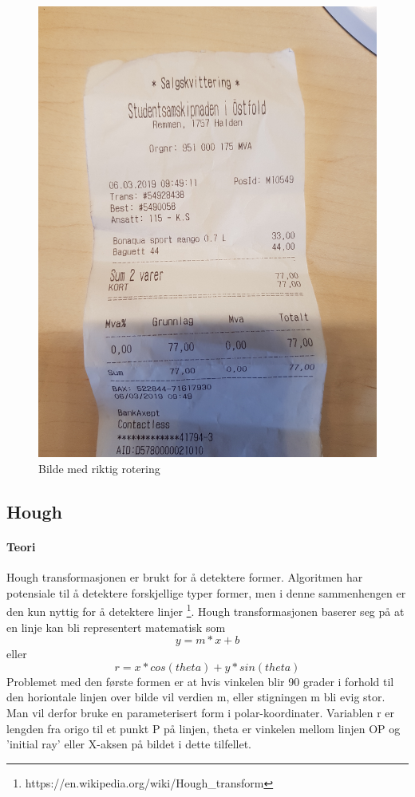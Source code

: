 \documentclass{article}
\begin{document}
\begin{figure}[h]
\centering
\includegraphics[scale=0.05, angle=270]{images/skewed10}
\caption{Bilde med riktig rotering}
\label{fig:skewed10}
\end{figure}

\subsection{Hough}
\paragraph{Teori}
Hough transformasjonen er brukt for å detektere former. Algoritmen har potensiale til å detektere forskjellige typer former, men i denne sammenhengen er den kun nyttig for å detektere linjer \footnote{https://en.wikipedia.org/wiki/Hough\_transform}. Hough transformasjonen baserer seg på at en linje kan bli representert matematisk som $$y = m * x + b$$ eller $$r = x * cos(theta) + y * sin(theta)$$ Problemet med den første formen er at hvis vinkelen blir 90 grader i forhold til den horiontale linjen over bilde vil verdien m, eller stigningen m bli evig stor. Man vil derfor bruke en parameterisert form i polar-koordinater. Variablen r er lengden fra origo til et punkt P på linjen, theta er vinkelen mellom linjen OP og 'initial ray' eller X-aksen på bildet i dette tilfellet.
\end{document}
